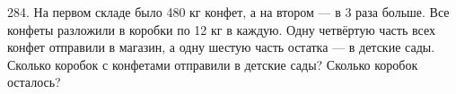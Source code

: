 284. На первом складе было 480 кг конфет, а на втором --- в 3 раза больше. Все конфеты разложили в коробки по 12 кг в каждую. Одну четвёртую часть всех конфет отправили в магазин, а одну шестую часть остатка --- в детские сады. Сколько коробок с конфетами отправили в детские сады? Сколько коробок осталось?\\
